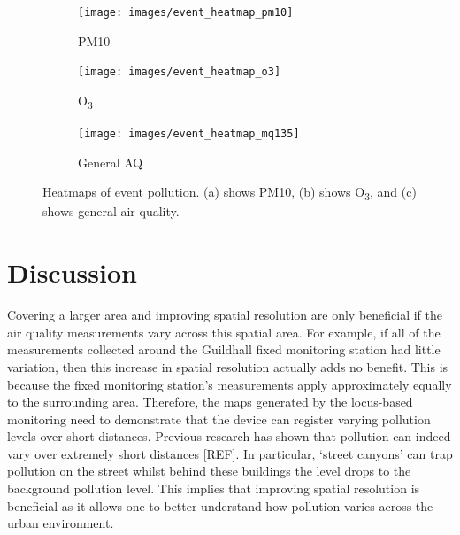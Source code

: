 \documentclass[11pt]{report}
\begin{document}
\begin{figure}[!tb]
    \centering
    \begin{minipage}{1\linewidth}
            \begin{subfigure}[t]{.5\linewidth}
                \texttt{[image: images/event\_heatmap\_pm10]}
                \caption{PM10}
                \label{fig:event_heatmap_pm10}
            \end{subfigure}
            \begin{subfigure}[t]{.5\linewidth}
            	\texttt{[image: images/event\_heatmap\_o3]}
            	\caption{O\textsubscript{3}}
            	\label{fig:event_heatmap_o3}
	   \end{subfigure}
        \end{minipage}
    \begin{minipage}{1\linewidth}
    	\centering
            \begin{subfigure}[t]{.5\linewidth}
                \texttt{[image: images/event\_heatmap\_mq135]}
                \caption{General AQ}
                \label{fig:event_heatmap_mq135}
            \end{subfigure}
        \end{minipage}
    \caption[Heatmaps of event pollution.]{Heatmaps of event pollution. (a) shows PM10, (b) shows O\textsubscript{3}, and (c) shows general air quality.}
    \label{fig:event_heatmaps}
\end{figure}

\section{Discussion}

Covering a larger area and improving spatial resolution are only beneficial if the air quality measurements vary across this spatial area. For example, if all of the measurements collected around the Guildhall fixed monitoring station had little variation, then this increase in spatial resolution actually adds no benefit. This is because the fixed monitoring station's measurements apply approximately equally to the surrounding area. Therefore, the maps generated by the locus-based monitoring need to demonstrate that the device can register varying pollution levels over short distances. Previous research has shown that pollution can indeed vary over extremely short distances [REF]. In particular, `street canyons' can trap pollution on the street whilst behind these buildings the level drops to the background pollution level. This implies that improving spatial resolution is beneficial as it allows one to better understand how pollution varies across the urban environment. 
\end{document}
